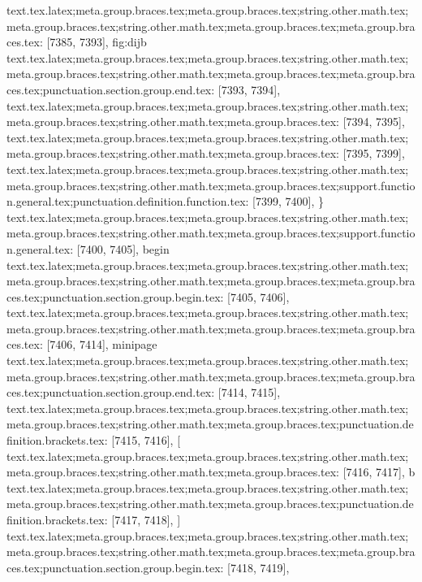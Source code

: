 {{{{{{{{{{{{{{{{{{{{{{{{{{{{{{{{{{{{{{{{{{{{{{{{{{{{{{{{{{{{{{{{{{{{{{{{{{{{{{{{{{{{{{{{{{{{{{{{{{{{{{{{{{{{{{{{{{{{{{{{{{{{{{{{{{{{{{{{{{{{{{{{{{{{{{{{{{{{{{{{{{{{{{{{{{{{{{{{{{{{{{{{{{{{{{{{{{{{{{{{{text.tex.latex;meta.group.braces.tex;meta.group.braces.tex;string.other.math.tex;meta.group.braces.tex;string.other.math.tex;meta.group.braces.tex;meta.group.braces.tex: [7385, 7393], {fig:dijb}
text.tex.latex;meta.group.braces.tex;meta.group.braces.tex;string.other.math.tex;meta.group.braces.tex;string.other.math.tex;meta.group.braces.tex;meta.group.braces.tex;punctuation.section.group.end.tex: [7393, 7394], {}}
text.tex.latex;meta.group.braces.tex;meta.group.braces.tex;string.other.math.tex;meta.group.braces.tex;string.other.math.tex;meta.group.braces.tex: [7394, 7395], {
}
text.tex.latex;meta.group.braces.tex;meta.group.braces.tex;string.other.math.tex;meta.group.braces.tex;string.other.math.tex;meta.group.braces.tex: [7395, 7399], {    }
text.tex.latex;meta.group.braces.tex;meta.group.braces.tex;string.other.math.tex;meta.group.braces.tex;string.other.math.tex;meta.group.braces.tex;support.function.general.tex;punctuation.definition.function.tex: [7399, 7400], {\}
text.tex.latex;meta.group.braces.tex;meta.group.braces.tex;string.other.math.tex;meta.group.braces.tex;string.other.math.tex;meta.group.braces.tex;support.function.general.tex: [7400, 7405], {begin}
text.tex.latex;meta.group.braces.tex;meta.group.braces.tex;string.other.math.tex;meta.group.braces.tex;string.other.math.tex;meta.group.braces.tex;meta.group.braces.tex;punctuation.section.group.begin.tex: [7405, 7406], {{}
text.tex.latex;meta.group.braces.tex;meta.group.braces.tex;string.other.math.tex;meta.group.braces.tex;string.other.math.tex;meta.group.braces.tex;meta.group.braces.tex: [7406, 7414], {minipage}
text.tex.latex;meta.group.braces.tex;meta.group.braces.tex;string.other.math.tex;meta.group.braces.tex;string.other.math.tex;meta.group.braces.tex;meta.group.braces.tex;punctuation.section.group.end.tex: [7414, 7415], {}}
text.tex.latex;meta.group.braces.tex;meta.group.braces.tex;string.other.math.tex;meta.group.braces.tex;string.other.math.tex;meta.group.braces.tex;punctuation.definition.brackets.tex: [7415, 7416], {[}
text.tex.latex;meta.group.braces.tex;meta.group.braces.tex;string.other.math.tex;meta.group.braces.tex;string.other.math.tex;meta.group.braces.tex: [7416, 7417], {b}
text.tex.latex;meta.group.braces.tex;meta.group.braces.tex;string.other.math.tex;meta.group.braces.tex;string.other.math.tex;meta.group.braces.tex;punctuation.definition.brackets.tex: [7417, 7418], {]}
text.tex.latex;meta.group.braces.tex;meta.group.braces.tex;string.other.math.tex;meta.group.braces.tex;string.other.math.tex;meta.group.braces.tex;meta.group.braces.tex;punctuation.section.group.begin.tex: [7418, 7419], {{}
}}}}}}}}}}}}}}}}}}}}}}}}}}}}}}}}}}}}}}}}}}}}}}}}}}}}}}}}}}}}}}}}}}}}}}}}}}}}}}}}}}}}}}}}}}}}}}}}}}}}}}}}}}}}}}}}}}}}}}}}}}}}}}}}}}}}}}}}}}}}}}}}}}}}}}}}}}}}}}}}}}}}}}}}}}}}}}}}}}}}}}}}}}}}}}}}}}}}}}}}}}
